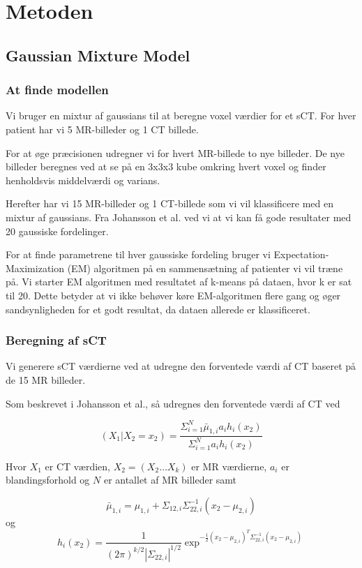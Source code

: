 \section{Metoden}
\subsection{Gaussian Mixture Model}

\subsubsection{At finde modellen}
Vi bruger en mixtur af gaussians til at beregne voxel værdier
for et sCT. For hver patient har vi 5 MR-billeder og 1 CT billede.

For at øge præcisionen udregner vi for hvert MR-billede
to nye billeder. De nye billeder beregnes ved at se på en 3x3x3
kube omkring hvert voxel og finder henholdsvis middelværdi og varians.

Herefter har vi 15 MR-billeder og 1 CT-billede som vi vil klassificere
med en mixtur af gaussians. Fra Johansson et al. ved vi at vi kan få
gode resultater med 20 gaussiske fordelinger. 

For at finde parametrene til hver gaussiske fordeling bruger vi
Expecta\-tion-Maximization (EM) algoritmen på en sammensætning af patienter
vi vil træne på. Vi starter EM algoritmen med resultatet af k-means på
dataen, hvor k er sat til 20. Dette betyder at vi ikke behøver køre
EM-algoritmen flere gang og øger sandsynligheden for et godt resultat, da
dataen allerede er klassificeret.

\subsubsection{Beregning af sCT}

Vi generere sCT værdierne ved at udregne den forventede værdi af CT baseret på de 15 MR billeder. 

Som beskrevet i Johansson et al., så udregnes den forventede værdi af CT ved

\begin{equation}
(X_1 | X_2 = x_2) = \frac{\Sigma^{N}_{i=1} \bar{\mu}_{1,i} a_i h_i(x_2)}{\Sigma^{N}_{i=1} a_i h_i(x_2)}
\end{equation}

Hvor $X_1$ er CT værdien, $X_2 = (X_2 \dots X_k)$ er MR værdierne, $a_i$ er blandingsforhold og $N$ er antallet af MR billeder samt

\begin{equation}
 \bar{\mu}_{1,i} = \mu_{1,i} + \Sigma_{1 2, i} \Sigma^{-1}_{22, i}(x_2 - \mu_{2,i})
\end{equation}
og
\begin{equation}
h_i(x_2)= \frac{1}{( 2 \pi )^{k/2}|\Sigma_{22,i}|^{1/2}}\exp^{-\frac{1}{2}(x_2 - \mu_{2,i})^T \Sigma^{-1}_{22, i}(x_2 - \mu_{2,i})}
\end{equation}

